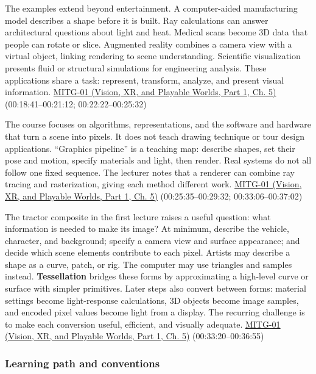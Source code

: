 The examples extend beyond entertainment. A computer-aided manufacturing model describes a shape before it is built. Ray calculations can answer architectural questions about light and heat. Medical scans become 3D data that people can rotate or slice. Augmented reality combines a camera view with a virtual object, linking rendering to scene understanding. Scientific visualization presents fluid or structural simulations for engineering analysis. These applications share a task: represent, transform, analyze, and present visual information. \href{../07-Vision-XR-and-Playable-Worlds-P01/main.pdf\#04-visual-computing-ii-ch036-mitg-01---introduction}{MITG-01 (Vision, XR, and Playable Worlds, Part 1, Ch. 5)} (00:18:41--00:21:12; 00:22:22--00:25:32)

The course focuses on algorithms, representations, and the software and hardware that turn a scene into pixels. It does not teach drawing technique or tour design applications. ``Graphics pipeline'' is a teaching map: describe shapes, set their pose and motion, specify materials and light, then render. Real systems do not all follow one fixed sequence. The lecturer notes that a renderer can combine ray tracing and rasterization, giving each method different work. \href{../07-Vision-XR-and-Playable-Worlds-P01/main.pdf\#04-visual-computing-ii-ch036-mitg-01---introduction}{MITG-01 (Vision, XR, and Playable Worlds, Part 1, Ch. 5)} (00:25:35--00:29:32; 00:33:06--00:37:02)

The tractor composite in the first lecture raises a useful question: what information is needed to make its image? At minimum, describe the vehicle, character, and background; specify a camera view and surface appearance; and decide which scene elements contribute to each pixel. Artists may describe a shape as a curve, patch, or rig. The computer may use triangles and samples instead. \textbf{Tessellation} bridges these forms by approximating a high-level curve or surface with simpler primitives. Later steps also convert between forms: material settings become light-response calculations, 3D objects become image samples, and encoded pixel values become light from a display. The recurring challenge is to make each conversion useful, efficient, and visually adequate. \href{../07-Vision-XR-and-Playable-Worlds-P01/main.pdf\#04-visual-computing-ii-ch036-mitg-01---introduction}{MITG-01 (Vision, XR, and Playable Worlds, Part 1, Ch. 5)} (00:33:20--00:36:55)

\subsubsection{Learning path and conventions}\label{03-visual-computing-i-ch001-learning-path-and-conventions}

